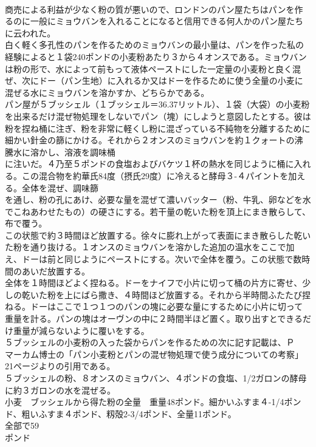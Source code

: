 \documentclass[8pt]{extreport}
\begin{document}
\begin{CJK}{UTF8}{min}
\\	商売による利益が少なく粉の質が悪いので、ロンドンのパン屋たちはパンを作るのに一般にミョウバンを入れることになると信用できる何人かのパン屋たちに云われた。
\\	白く軽く多孔性のパンを作るためのミョウバンの最小量は、パンを作った私の経験によると１袋240ポンドの小麦粉あたり３から４オンスである。ミョウバンは粉の形で、水によって前もって液体ペーストにした一定量の小麦粉と良く混ぜ、次にドー（パン生地）に入れるか又はドーを作るために使う全量の小麦に混ぜる水にミョウバンを溶かすか、どちらかである。
\\	パン屋が５ブッシェル（１ブッシェル＝36.37リットル）、１袋（大袋）の小麦粉を出来るだけ混ぜ物処理をしないでパン（塊）にしようと意図したとする。彼は粉を捏ね桶に注ぎ、粉を非常に軽くし粉に混ざっている不純物を分離するために細かい針金の篩にかける。それから２オンスのミョウバンを約１クォートの沸騰水に溶かし、溶液を調味桶
\\	に注いだ。４乃至５ポンドの食塩およびバケツ１杯の熱水を同じように桶に入れる。この混合物を約華氏84度（摂氏29度）に冷えると酵母３-４パイントを加える。全体を混ぜ、調味篩
\\	を通し、粉の孔にあけ、必要な量を混ぜて濃いバッター（粉、牛乳、卵などを水でこねあわせたもの）の硬さにする。若干量の乾いた粉を頂上にまき散らして、布で覆う。
\\	この状態で約３時間ほど放置する。徐々に膨れ上がって表面にまき散らした乾いた粉を通り抜ける。１オンスのミョウバンを溶かした追加の温水をここで加え、ドーは前と同じようにペーストにする。次いで全体を覆う。この状態で数時間のあいだ放置する。
\\	全体を１時間ほどよく捏ねる。ドーをナイフで小片に切って桶の片方に寄せ、少しの乾いた粉を上にばら撒き、４時間ほど放置する。それから半時間ふたたび捏ねる。ドーはここで１つ１つのパンの塊に必要な量にするために小片に切って重量を計る。パンの塊はオーヴンの中に２時間半ほど置く。取り出すとできるだけ重量が減らないように覆いをする。
\\	５ブッシェルの小麦粉の入った袋からパンを作るための次に記す記載は、Ｐ
\\	マーカム博士の「パン小麦粉とパンの混ぜ物処理で使う成分についての考察」21ページよりの引用である。
\\	５ブッシェルの粉、８オンスのミョウバン、４ポンドの食塩、1/2ガロンの酵母に約３ガロンの水を混ぜる。
\\	小麦　ブッシェルから得た粉の全量　重量48ポンド。細かいふすま４-1/4ポンド、粗いふすま４ポンド、籾殻2-3/4ポンド、全量11ポンド。
\\	全部で59
\\	ポンド

\end{CJK}
\end{document}
